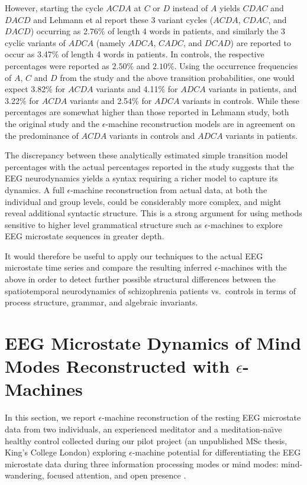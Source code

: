 \documentclass[journal]{IEEEtran}
\begin{document}
However, starting the cycle $ACDA$ at  $C$ or $D$ instead of $A$ yields $CDAC$ and $DACD$ and Lehmann et al report  these 3 variant cycles ($ACDA$, $CDAC$, and $DACD$) occurring 
 as 2.76\%  of length 4 words in patients, and similarly the 3 cyclic variants of  $ADCA$  (namely $ADCA$, $CADC$,  and $DCAD$)  are reported to
                 occur as 3.47\%  of length 4 words in patients. 
In controls,  the respective percentages     were reported as $2.50\% $ and $2.10\% $.
Using the occurrence frequencies of $A$, $C$ and $D$ from the study and the above transition probabilities, 
         one would expect 3.82\%  for $ACDA$ variants and 4.11\%  for $ADCA$ variants in patients, 
 and  3.22\%  for $ACDA$ variants and 2.54\%  for $ADCA$ variants in controls. 
 While these percentages are somewhat higher than those reported in Lehmann study, both  the original study and the $\epsilon$-machine reconstruction models 
are in agreement on the predominance of $ACDA$ variants in controls and $ADCA$ variants in patients.

The discrepancy between  these analytically estimated simple transition model percentages with the actual percentages reported in the study suggests that
 the EEG neurodynamics  yields a syntax requiring a richer model to capture its dynamics.  A full $\epsilon$-machine
reconstruction from actual data, at both the individual and group levels, could be considerably more complex, and might reveal additional syntactic structure.
 This is a strong argument for using methods sensitive to
higher level grammatical structure such as $\epsilon$-machines to explore EEG microstate sequences in greater depth.

 It would therefore be useful to apply our
techniques to the actual EEG microstate time series and compare the resulting inferred $\epsilon$-machines with the above in order to detect further
possible structural differences between the spatiotemporal neurodynamics of schizophrenia patients vs.\  controls in terms of
process structure, grammar, and algebraic invariants. 



\section{EEG Microstate Dynamics of Mind Modes Reconstructed with $\epsilon$-Machines}\label{Med}


In this section, we report $\epsilon$-machine reconstruction of the resting EEG microstate data from two individuals, an experienced meditator and a meditation-na\"{\i}ve healthy control collected  during our pilot project (an unpublished MSc thesis, King's College London) exploring $\epsilon$-machine potential for differentiating the EEG microstate data during three information processing modes or mind modes:  mind-wandering, focused attention, and open presence \cite{GwynThesis}.
\end{document}
